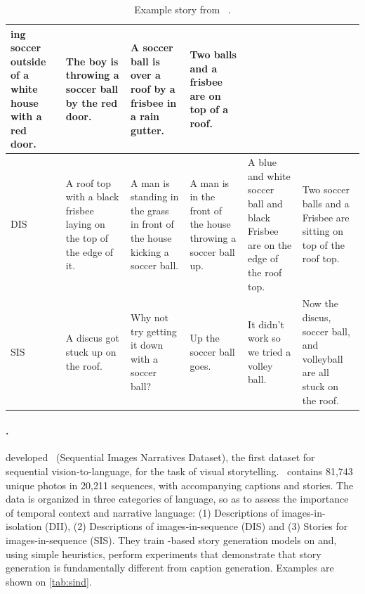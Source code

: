 \begin{table}[h!]
\begin{tabular}{lp{}p{}p{}p{}p{}}
ing soccer outside of a white house with a red door. & The boy is throwing a soccer ball by the red door. & A soccer ball is over a roof by a frisbee in a rain gutter. & Two balls and a frisbee are on top of a roof. \\
\midrule
DIS	& A roof top with a black frisbee laying on the top of the edge of it. & A man is standing in the grass in front of the house kicking a soccer ball. & A man is in the front of the house throwing a soccer ball up. & A blue and white soccer ball and black Frisbee are on the edge of the roof top. & Two soccer balls and a Frisbee are sitting on top of the roof top. \\
\midrule
SIS	& A discus got stuck up on the roof. & Why not try getting it down with a soccer ball? & Up the soccer ball goes. & It didn't work so we tried a volley ball. & Now the discus, soccer ball, and volleyball are all stuck on the roof. \\
\bottomrule
\end{tabular}
\caption{Example story from \sind\ \citep{huang2016visual}.}
\label{tab:sind}
\end{table}

\paragraph{\sind.}
\citet{huang2016visual} developed \sind\ (Sequential Images Narratives Dataset), the first dataset for sequential vision-to-language, for the task of visual storytelling. \sind\ contains 81,743 unique photos in 20,211 sequences, with accompanying captions and stories. The data is organized in three categories of language, so as to assess the importance of temporal context and narrative language: (1) Descriptions of images-in-isolation (\textsc{DII}), (2) Descriptions of images-in-sequence (\textsc{DIS}) and (3) Stories for images-in-sequence (\textsc{SIS}). They train {\rnn}-based story generation models on {\sind} and, using simple heuristics, perform experiments that demonstrate that story generation is fundamentally different from caption generation. Examples are shown on \autoref{tab:sind}.

